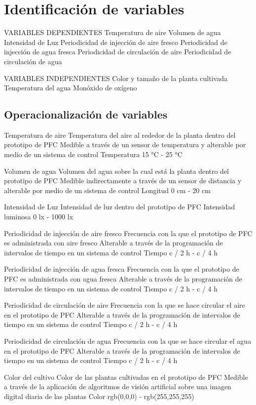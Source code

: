 \documentclass{report}
\begin{document}
\section{Identificación de variables}
VARIABLES DEPENDIENTES
Temperatura de aire
Volumen de agua
Intensidad de Luz
Periodicidad de injección de aire fresco
Periodicidad de injección de agua fresca
Periodicidad de circulación de aire
Periodicidad de circulación de agua

VARIABLES INDEPENDIENTES
Color y tamaño de la planta cultivada
Temperatura del agua
Monóxido de oxígeno
\subsection{Operacionalización de variables}
Temperatura de aire
Temperatura del aire al rededor de la planta dentro del prototipo de PFC
Medible a través de un sensor de temperatura y alterable por medio de un sistema
de control
Temperatura
15 °C - 25 °C

Volumen de agua
Volumen del agua sobre la cual está la planta dentro del prototipo de PFC
Medible indirectamente a través de un sensor de distancia y alterable por medio
de un sistema de control
Longitud
0 cm - 20 cm

Intensidad de Luz
Intensidad de luz dentro del prototipo de PFC
Intensidad luminosa
0 lx - 1000 lx

Periodicidad de injección de aire fresco
Frecuencia con la que el prototipo de PFC es administrada con aire fresco
Alterable a través de la programación de intervalos de tiempo en un sistema de control
Tiempo
c / 2 h  - c / 4 h

Periodicidad de injección de agua fresca
Frecuencia con la que el prototipo de PFC es administrada con agua fresca
Alterable a través de la programación de intervalos de tiempo en un sistema de
control
Tiempo
c / 2 h  - c / 4 h

Periodicidad de circulación de aire
Frecuencia con la que se hace circular el aire en el prototipo de PFC
Alterable a través de la programación de intervalos de tiempo en un sistema de
control
Tiempo
c / 2 h  - c / 4 h

Periodicidad de circulación de agua
Frecuencia con la que se hace circular el agua en el prototipo de PFC
Alterable a través de la programación de intervalos de tiempo en un sistema de
control
Tiempo
c / 2 h  - c / 4 h

Color del cultivo
Color de las plantas cultivadas en el prototipo de PFC
Medible a través de la aplicación de algoritmos de visión artificial sobre una
imagen digital diaria de las plantas
Color
rgb(0,0,0) - rgb(255,255,255)
\end{document}
